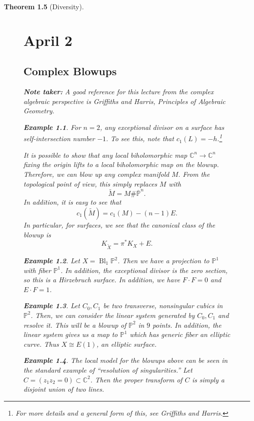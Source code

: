 \documentclass[leqno, openany]{memoir}
\newtheorem{thm}{Theorem}[chapter]
\theoremstyle{definition}
\newtheorem{exm}[thm]{Example}
\theoremstyle{remark}
\theoremstyle{plain}
\theoremstyle{definition}
\theoremstyle{remark}
\newcommand{\C}{\mathbb{C}}
\renewcommand{\P}{\mathbb{P}}
\DeclareMathOperator{\Bl}{Bl} %
\begin{document}
\begin{thm}[Diversity]
\begin{figure}[H]
    \chapter{April 2}%

    \section{Complex Blowups}%

    \textbf{Note taker:} A good reference for this lecture from the complex
    algebraic perspective is Griffiths and Harris, \textit{Principles of
    Algebraic Geometry.}

    \begin{exm} For $n = 2$, any exceptional divisor on a surface has
    self-intersection number $-1$. To see this, note that $c_1(L) =
-h$.\footnote{For more details and a general form of this, see Griffiths and
Harris.} \end{exm}

    It is possible to show that any local biholomorphic map $\C^n \to \C^n$
    fixing the origin lifts to a local biholomorphic map on the blowup.
    Therefore, we can blow up any complex manifold $M$. From the topological
    point of view, this simply replaces $M$ with \[ \widetilde{M} = M \#
    \overline{\P}^{n}. \] In addition, it is easy to see that \[
    c_1(\widetilde{M}) = c_1(M) - (n-1) E. \] In particular, for surfaces, we
    see that the canonical class of the blowup is \[ K_{\widetilde{X}} = \pi^*
    K_X + E. \]

    \begin{exm} Let $X = \Bl_1 \P^2$. Then we have a projection to $\P^1$ with
        fiber $\P^1$. In addition, the exceptional divisor is the zero section,
        so this is a \textit{Hirzebruch surface}. In addition, we have $F \cdot
        F = 0$ and $E \cdot F = 1$.  \end{exm}

    \begin{exm} Let $C_0, C_1$ be two transverse, nonsingular cubics in $\P^2$.
        Then, we can consider the linear system generated by $C_0, C_1$ and
        resolve it. This will be a blowup of $\P^2$ in $9$ points. In addition,
        the linear system gives us a map to $\P^1$ which has generic fiber an
        elliptic curve. Thus $X \cong E(1)$, an \textit{elliptic surface}.
    \end{exm}

    \begin{exm} The local model for the blowups above can be seen in the
        standard example of ``resolution of singularities.'' Let $C = (z_1z_2 =
        0) \subset \C^2$. Then the \textit{proper transform} of $C$ is simply a
        disjoint union of two lines.  \end{exm}


\end{figure}
\end{thm}
\end{document}
